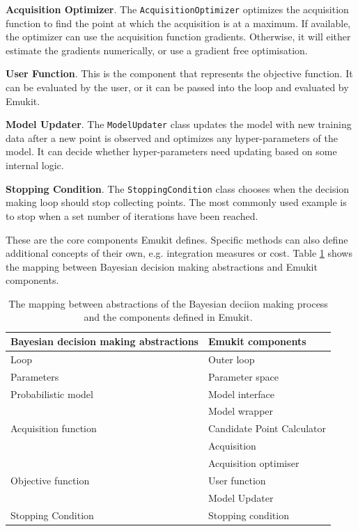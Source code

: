 \textbf{Acquisition Optimizer}. The \texttt{AcquisitionOptimizer} optimizes the acquisition function to find the point at which the acquisition is at a maximum. If available, the optimizer can use the acquisition function gradients. Otherwise, it will either estimate the gradients numerically, or use a gradient free optimisation.

\textbf{User Function}. This is the component that represents the objective function. It can be evaluated by the user, or it can be passed into the loop and evaluated by Emukit.

\textbf{Model Updater}. The \texttt{ModelUpdater} class updates the model with new training data after a new point is observed and optimizes any hyper-parameters of the model. It can decide whether hyper-parameters need updating based on some internal logic.

\textbf{Stopping Condition}. The \texttt{StoppingCondition} class chooses when the decision making loop should stop collecting points. The most commonly used example is to stop when a set number of iterations have been reached.

These are the core components Emukit defines. Specific methods can also define additional concepts of their own, e.g. integration measures or cost. Table \ref{table:abstraction_mapping} shows the mapping between Bayesian decision making abstractions and Emukit components.

\begin{table}
    \setlength{\DUtablewidth}{\tablewidth}
    \begin{longtable}[c]{p{0.4\DUtablewidth}p{0.4\DUtablewidth}}
        \toprule
        \textbf{Bayesian decision making abstractions} & \textbf{Emukit components} \\
        \midrule
        \endfirsthead
        Loop & Outer loop \\
        \midrule
        Parameters & Parameter space \\
        Probabilistic model & Model interface \\
        & Model wrapper \\
        \midrule
        Acquisition function & Candidate Point Calculator \\
        & Acquisition \\
        & Acquisition optimiser \\
        \midrule
        Objective function & User function \\
        & Model Updater \\
        \midrule
        Stopping Condition & Stopping condition \\
        \bottomrule
    \end{longtable}
    \caption{The mapping between abstractions of the Bayesian deciion making process and the components defined in Emukit.}
    \label{table:abstraction_mapping}
\end{table}

